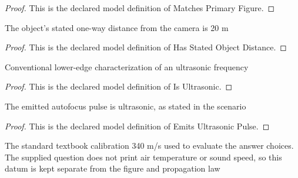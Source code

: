 \begin{proof}
  This is the declared model definition of Matches Primary Figure.
\end{proof}
\begin{definition}
  \label{def:physics:phyx-mini-0211:phyxminiproblems-problemphyxmini0211-hasstatedobjectdistance}
  The object's stated one-way distance from the camera is 20 m
\end{definition}
\begin{proof}
  This is the declared model definition of Has Stated Object Distance.
\end{proof}
\begin{definition}[Is Ultrasonic]
  \label{def:physics:phyx-mini-0211:phyxminiproblems-problemphyxmini0211-isultrasonic}
  Conventional lower-edge characterization of an ultrasonic frequency
\end{definition}
\begin{proof}
  This is the declared model definition of Is Ultrasonic.
\end{proof}
\begin{definition}
  \label{def:physics:phyx-mini-0211:phyxminiproblems-problemphyxmini0211-emitsultrasonicpulse}
  The emitted autofocus pulse is ultrasonic, as stated in the scenario
\end{definition}
\begin{proof}
  This is the declared model definition of Emits Ultrasonic Pulse.
\end{proof}
\begin{definition}
  \label{def:physics:phyx-mini-0211:phyxminiproblems-problemphyxmini0211-usesstandardairsoundspeed}
  The standard textbook calibration 340 m/s used to evaluate the answer choices. The supplied question does not print air temperature or sound speed, so this datum is kept separate from the figure and propagation law
\end{definition}
